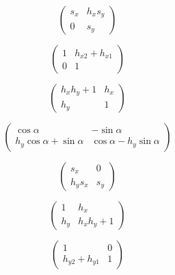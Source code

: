 \[\tag{XS}
\begin{pmatrix}
{s_x} & {h_x} {s_y}\\
0 & {s_y}
\end{pmatrix}\]

\[\tag{X1X2}
\begin{pmatrix}
1 & {h_{x2}}+{h_{x1}}\\
0 & 1
\end{pmatrix}\]

\[\tag{XY}
\begin{pmatrix}
{h_x} {h_y}+1 & {h_x}\\
{h_y} & 1
\end{pmatrix}\]

\[\tag{YR}
\begin{pmatrix}
\cos{\alpha} & -\sin{\alpha}\\
{h_y} \cos{\alpha}+\sin{\alpha} & \cos{\alpha}-{h_y} \sin{\alpha}
\end{pmatrix}\]

\[\tag{YS}
\begin{pmatrix}
{s_x} & 0\\
{h_y} {s_x} & {s_y}
\end{pmatrix}\]

\[\tag{YX}
\begin{pmatrix}
1 & {h_x}\\
{h_y} & {h_x} {h_y}+1
\end{pmatrix}\]

\[\tag{Y1Y2}
\begin{pmatrix}
1 & 0\\
{h_{y2}}+{h_{y1}} & 1
\end{pmatrix}\]

